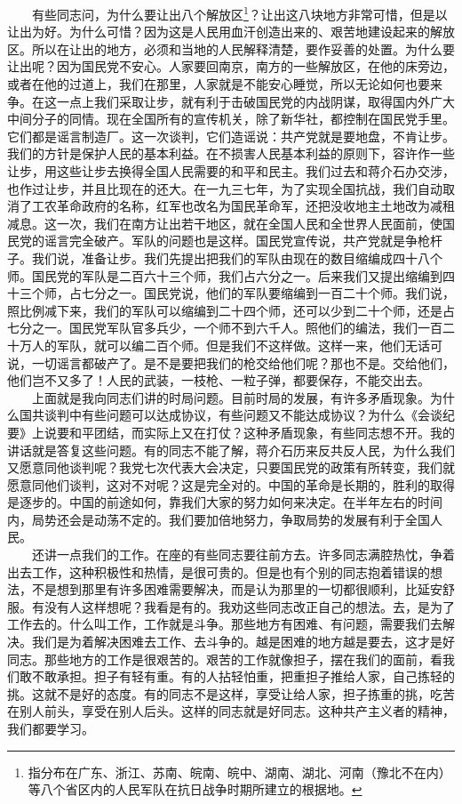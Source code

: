 \documentclass[cn,11pt,chinese]{elegantbook}
\begin{document}
　　有些同志问，为什么要让出八个解放区\footnote[6]{ 指分布在广东、浙江、苏南、皖南、皖中、湖南、湖北、河南（豫北不在内）等八个省区内的人民军队在抗日战争时期所建立的根据地。}？让出这八块地方非常可惜，但是以让出为好。为什么可惜？因为这是人民用血汗创造出来的、艰苦地建设起来的解放区。所以在让出的地方，必须和当地的人民解释清楚，要作妥善的处置。为什么要让出呢？因为国民党不安心。人家要回南京，南方的一些解放区，在他的床旁边，或者在他的过道上，我们在那里，人家就是不能安心睡觉，所以无论如何也要来争。在这一点上我们采取让步，就有利于击破国民党的内战阴谋，取得国内外广大中间分子的同情。现在全国所有的宣传机关，除了新华社，都控制在国民党手里。它们都是谣言制造厂。这一次谈判，它们造谣说：共产党就是要地盘，不肯让步。我们的方针是保护人民的基本利益。在不损害人民基本利益的原则下，容许作一些让步，用这些让步去换得全国人民需要的和平和民主。我们过去和蒋介石办交涉，也作过让步，并且比现在的还大。在一九三七年，为了实现全国抗战，我们自动取消了工农革命政府的名称，红军也改名为国民革命军，还把没收地主土地改为减租减息。这一次，我们在南方让出若干地区，就在全国人民和全世界人民面前，使国民党的谣言完全破产。军队的问题也是这样。国民党宣传说，共产党就是争枪杆子。我们说，准备让步。我们先提出把我们的军队由现在的数目缩编成四十八个师。国民党的军队是二百六十三个师，我们占六分之一。后来我们又提出缩编到四十三个师，占七分之一。国民党说，他们的军队要缩编到一百二十个师。我们说，照比例减下来，我们的军队可以缩编到二十四个师，还可以少到二十个师，还是占七分之一。国民党军队官多兵少，一个师不到六千人。照他们的编法，我们一百二十万人的军队，就可以编二百个师。但是我们不这样做。这样一来，他们无话可说，一切谣言都破产了。是不是要把我们的枪交给他们呢？那也不是。交给他们，他们岂不又多了！人民的武装，一枝枪、一粒子弹，都要保存，不能交出去。\\
　　上面就是我向同志们讲的时局问题。目前时局的发展，有许多矛盾现象。为什么国共谈判中有些问题可以达成协议，有些问题又不能达成协议？为什么《会谈纪要》上说要和平团结，而实际上又在打仗？这种矛盾现象，有些同志想不开。我的讲话就是答复这些问题。有的同志不能了解，蒋介石历来反共反人民，为什么我们又愿意同他谈判呢？我党七次代表大会决定，只要国民党的政策有所转变，我们就愿意同他们谈判，这对不对呢？这是完全对的。中国的革命是长期的，胜利的取得是逐步的。中国的前途如何，靠我们大家的努力如何来决定。在半年左右的时间内，局势还会是动荡不定的。我们要加倍地努力，争取局势的发展有利于全国人民。\\
　　还讲一点我们的工作。在座的有些同志要往前方去。许多同志满腔热忱，争着出去工作，这种积极性和热情，是很可贵的。但是也有个别的同志抱着错误的想法，不是想到那里有许多困难需要解决，而是认为那里的一切都很顺利，比延安舒服。有没有人这样想呢？我看是有的。我劝这些同志改正自己的想法。去，是为了工作去的。什么叫工作，工作就是斗争。那些地方有困难、有问题，需要我们去解决。我们是为着解决困难去工作、去斗争的。越是困难的地方越是要去，这才是好同志。那些地方的工作是很艰苦的。艰苦的工作就像担子，摆在我们的面前，看我们敢不敢承担。担子有轻有重。有的人拈轻怕重，把重担子推给人家，自己拣轻的挑。这就不是好的态度。有的同志不是这样，享受让给人家，担子拣重的挑，吃苦在别人前头，享受在别人后头。这样的同志就是好同志。这种共产主义者的精神，我们都要学习。\\
\end{document}
